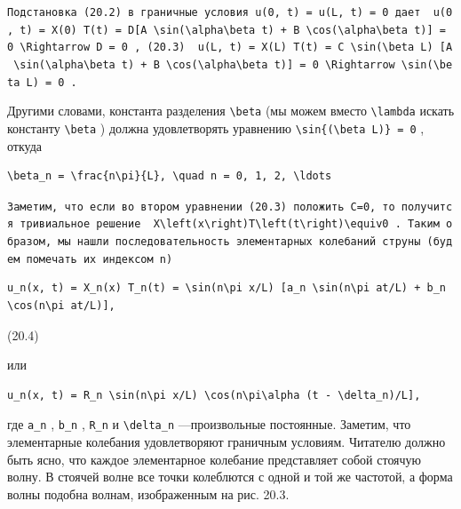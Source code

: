 \documentclass[
  ukrainian,
]{article}
\begin{document}
\texttt{Подстановка\ (20.2)\ в\ граничные\ условия\ \textquotesingle{}u(0,\ t)\textquotesingle{}\ =\ \textquotesingle{}u(L,\ t)\textquotesingle{}\ =\ 0\ дает\ \ \textquotesingle{}u(0,\ t)\ =\ X(0)\ T(t)\ =\ D{[}A\ \textbackslash{}sin(\textbackslash{}alpha\textbackslash{}beta\ t)\ +\ B\ \textbackslash{}cos(\textbackslash{}alpha\textbackslash{}beta\ t){]}\ =\ 0\ \textbackslash{}Rightarrow\ D\ =\ 0\textquotesingle{}\ ,\ (20.3)\ \ \textquotesingle{}u(L,\ t)\ =\ X(L)\ T(t)\ =\ C\ \textbackslash{}sin(\textbackslash{}beta\ L)\ {[}A\ \textbackslash{}sin(\textbackslash{}alpha\textbackslash{}beta\ t)\ +\ B\ \textbackslash{}cos(\textbackslash{}alpha\textbackslash{}beta\ t){]}\ =\ 0\ \textbackslash{}Rightarrow\ \textbackslash{}sin(\textbackslash{}beta\ L)\ =\ 0\textquotesingle{}\ .}

Другими словами, константа разделения \texttt{\textbackslash{}beta} (мы
можем вместо \texttt{\textbackslash{}lambda} искать константу
\texttt{\textbackslash{}beta} ) должна удовлетворять уравнению
\texttt{\textbackslash{}sin\{(\textbackslash{}beta\ L)\}\ =\ 0} , откуда

\begin{verbatim}
\beta_n = \frac{n\pi}{L}, \quad n = 0, 1, 2, \ldots
\end{verbatim}

\texttt{Заметим,\ что\ если\ во\ втором\ уравнении\ (20.3)\ положить\ C=0,\ то\ получится\ тривиальное\ решение\ \ \textquotesingle{}X\textbackslash{}left(x\textbackslash{}right)T\textbackslash{}left(t\textbackslash{}right)\textbackslash{}equiv0\textquotesingle{}\ .\ Таким\ образом,\ мы\ нашли\ последовательность\ элементарных\ колебаний\ струны\ (будем\ помечать\ их\ индексом\ n)}

\begin{verbatim}
u_n(x, t) = X_n(x) T_n(t) = \sin(n\pi x/L) [a_n \sin(n\pi at/L) + b_n \cos(n\pi at/L)],
\end{verbatim}

(20.4)

или

\begin{verbatim}
u_n(x, t) = R_n \sin(n\pi x/L) \cos(n\pi\alpha (t - \delta_n)/L],
\end{verbatim}

где \texttt{a\_n} , \texttt{b\_n} , \texttt{R\_n} и
\texttt{\textbackslash{}delta\_n} ---произвольные постоянные. Заметим,
что элементарные колебания удовлетворяют граничным условиям. Читателю
должно быть ясно, что каждое элементарное колебание представляет собой
стоячую волну. В стоячей волне все точки колеблются с одной и той же
частотой, а форма волны подобна волнам, изображенным на рис. 20.3.
\end{document}
